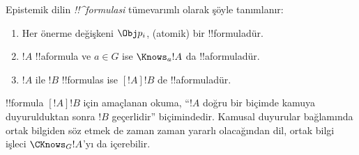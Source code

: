 \documentclass[../../../include/open-logic-section]{subfiles}
\begin{document}
\begin{defn}
  Epistemik dilin \emph{!!^{formula}s{}i} tümevarımlı olarak şöyle tanımlanır:
  \begin{enumerate}


  \item Her önerme değişkeni $\Obj p_i$, (atomik) bir
  !!{formula}{}dür.






  \item $!A$ !!a{formula} ve $a \in G$ ise $\Knows_a !A$ da
  !!a{formula}{}dür.
  
  \item $!A$ ile $!B$ !!{formula}s ise $[!A] !B$ de !!a{formula}{}dür.

\end{enumerate}
\end{defn}

!!{formula} $[!A] !B$ için amaçlanan okuma, ``$!A$ doğru bir biçimde kamuya
duyurulduktan sonra $!B$ geçerlidir'' biçimindedir. Kamusal duyurular
bağlamında ortak bilgiden söz etmek de zaman zaman yararlı olacağından dil,
ortak bilgi işleci $\CKnows_G !A$'yı da içerebilir.
\end{document}
